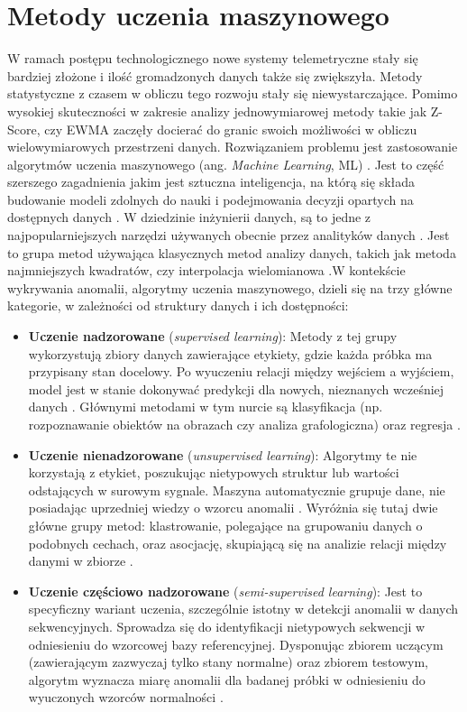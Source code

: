 \documentclass[a4paper,twoside,12pt]{book}
\newcommand{\obcy}[1]{\emph{#1}}
\newcommand{\english}[1]{{\selectlanguage{british}\obcy{#1}}}
\begin{document}
	\section{Metody uczenia maszynowego}
	W ramach postępu technologicznego nowe systemy telemetryczne stały się bardziej złożone i ilość gromadzonych danych także się zwiększyła. Metody statystyczne z czasem w obliczu tego rozwoju stały się niewystarczające. Pomimo wysokiej skuteczności w zakresie analizy jednowymiarowej metody takie jak Z-Score, czy EWMA zaczęły docierać do granic swoich możliwości w obliczu wielowymiarowych przestrzeni danych. Rozwiązaniem problemu jest zastosowanie algorytmów uczenia maszynowego (ang. \english{Machine Learning}, ML) . Jest to część szerszego zagadnienia jakim jest sztuczna inteligencja, na którą się składa budowanie modeli zdolnych do nauki i podejmowania decyzji opartych na dostępnych danych \cite{kufel2023machine}. W dziedzinie inżynierii danych, są to jedne z najpopularniejszych narzędzi używanych obecnie przez analityków danych \cite{lenart2024comparison}. Jest to grupa metod używająca klasycznych metod analizy danych, takich jak metoda najmniejszych kwadratów, czy interpolacja wielomianowa .W kontekście wykrywania anomalii, algorytmy uczenia maszynowego, dzieli się na trzy główne kategorie, w zależności od struktury danych i ich dostępności:  
	\begin{itemize}
		\item \textbf{Uczenie nadzorowane} (\textit{supervised learning}): Metody z tej grupy wykorzystują zbiory danych zawierające etykiety, gdzie każda próbka ma przypisany stan docelowy. Po wyuczeniu relacji między wejściem a wyjściem, model jest w stanie dokonywać predykcji dla nowych, nieznanych wcześniej danych \cite{kufel2023machine}. Głównymi metodami w tym nurcie są klasyfikacja (np. rozpoznawanie obiektów na obrazach czy analiza grafologiczna) oraz regresja \cite{kufel2023machine}.
		
		\item \textbf{Uczenie nienadzorowane} (\textit{unsupervised learning}): Algorytmy te nie korzystają z etykiet, poszukując nietypowych struktur lub wartości odstających w surowym sygnale. Maszyna automatycznie grupuje dane, nie posiadając uprzedniej wiedzy o wzorcu anomalii \cite{kufel2023machine}. Wyróżnia się tutaj dwie główne grupy metod: klastrowanie, polegające na grupowaniu danych o podobnych cechach, oraz asocjację, skupiającą się na analizie relacji między danymi w zbiorze \cite{kufel2023machine}.
		
		\item \textbf{Uczenie częściowo nadzorowane} (\textit{semi-supervised learning}): Jest to specyficzny wariant uczenia, szczególnie istotny w detekcji anomalii w danych sekwencyjnych. Sprowadza się do identyfikacji nietypowych sekwencji w odniesieniu do wzorcowej bazy referencyjnej. Dysponując zbiorem uczącym (zawierającym zazwyczaj tylko stany normalne) oraz zbiorem testowym, algorytm wyznacza miarę anomalii dla badanej próbki w odniesieniu do wyuczonych wzorców normalności \cite{chandola2009anomaly}.
	\end{itemize}
\end{document}
